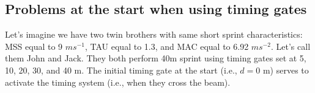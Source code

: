 \documentclass[fleqn,10pt]{wlpeerj} %
\newenvironment{Shaded}{\begin{snugshade}}{\end{snugshade}}
\newcommand{\AttributeTok}[1]{\textcolor[rgb]{0.77,0.63,0.00}{#1}}
\newcommand{\CommentTok}[1]{\textcolor[rgb]{0.56,0.35,0.01}{\textit{#1}}}
\newcommand{\DecValTok}[1]{\textcolor[rgb]{0.00,0.00,0.81}{#1}}
\newcommand{\FloatTok}[1]{\textcolor[rgb]{0.00,0.00,0.81}{#1}}
\newcommand{\FunctionTok}[1]{\textcolor[rgb]{0.00,0.00,0.00}{#1}}
\newcommand{\NormalTok}[1]{#1}
\newcommand{\OtherTok}[1]{\textcolor[rgb]{0.56,0.35,0.01}{#1}}
\newcommand{\SpecialCharTok}[1]{\textcolor[rgb]{0.00,0.00,0.00}{#1}}
\newcommand{\StringTok}[1]{\textcolor[rgb]{0.31,0.60,0.02}{#1}}
\begin{document}
\begin{Shaded}
\end{Shaded}

\normalsize

\hypertarget{problems-at-the-start-when-using-timing-gates}{%
\subsection{Problems at the start when using timing gates}\label{problems-at-the-start-when-using-timing-gates}}

Let's imagine we have two twin brothers with same short sprint characteristics: MSS equal to 9 \(ms^{-1}\), TAU equal to 1.3, and MAC equal to 6.92 \(ms^{-2}\). Let's call them John and Jack. They both perform 40m sprint using timing gates set at 5, 10, 20, 30, and 40 m. The initial timing gate at the start (i.e., \(d=0\) m) serves to activate the timing system (i.e., when they cross the beam).
\end{document}

